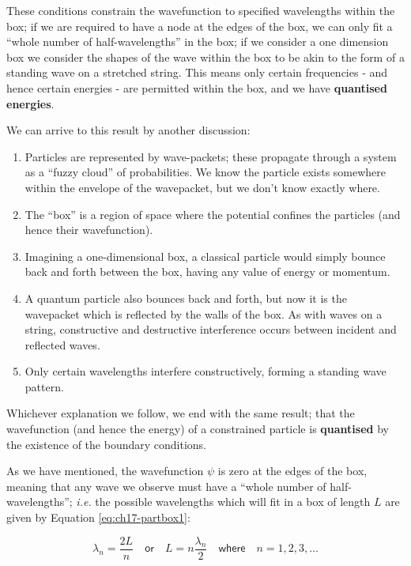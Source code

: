\documentclass[
]{book}
\providecommand{\tightlist}{%
  \setlength{\itemsep}{0pt}\setlength{\parskip}{0pt}}
\begin{document}
These conditions constrain the wavefunction to specified wavelengths within the box; if we are required to have a node at the edges of the box, we can only fit a ``whole number of half-wavelengths'' in the box; if we consider a one dimension box we consider the shapes of the wave within the box to be akin to the form of a standing wave on a stretched string. This means only certain frequencies - and hence certain energies - are permitted within the box, and we have \textbf{quantised energies}.

We can arrive to this result by another discussion:

\begin{enumerate}
\def\labelenumi{\arabic{enumi}.}
\tightlist
\item
  Particles are represented by wave-packets; these propagate through a system as a ``fuzzy cloud'' of probabilities. We know the particle exists somewhere within the envelope of the wavepacket, but we don't know exactly where.
\item
  The ``box'' is a region of space where the potential confines the particles (and hence their wavefunction).
\item
  Imagining a one-dimensional box, a classical particle would simply bounce back and forth between the box, having any value of energy or momentum.
\item
  A quantum particle also bounces back and forth, but now it is the wavepacket which is reflected by the walls of the box. As with waves on a string, constructive and destructive interference occurs between incident and reflected waves.
\item
  Only certain wavelengths interfere constructively, forming a standing wave pattern.
\end{enumerate}

Whichever explanation we follow, we end with the same result; that the wavefunction (and hence the energy) of a constrained particle is \textbf{quantised} by the existence of the boundary conditions.

As we have mentioned, the wavefunction \(\psi\) is zero at the edges of the box, meaning that any wave we observe must have a ``whole number of half-wavelengths''; \emph{i.e.} the possible wavelengths which will fit in a box of length \(L\) are given by Equation \eqref{eq:ch17-partbox1}:

\begin{equation}
\lambda_n = \frac{2L}{n} \quad \textsf{or} \quad L = n\frac{\lambda_n}{2} \quad \textsf{where} \quad n = 1,2,3, \dots
\label{eq:ch17-partbox1}
\end{equation}
\end{document}
